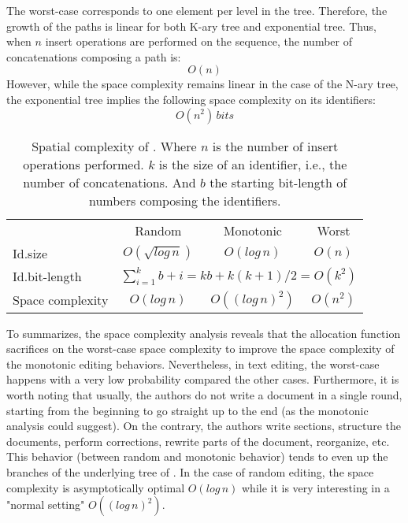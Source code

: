 \begin{asparadesc}
\item [The worst-case] corresponds to one element per level in the
  tree. Therefore, the growth of the paths is linear for both K-ary tree and
  exponential tree. Thus, when $n$ insert operations are performed on the
  sequence, the number of concatenations composing a path is:
  \begin{equation} O(n) \end{equation} However, while the space complexity
  remains linear in the case of the N-ary tree, the exponential tree implies
  the following space complexity on its identifiers:
  \begin{equation} O(n^2) \, bits \end{equation}
\end{asparadesc}

\begin{table}
  \centering
  \begin{tabular}{@{}lccc@{}}
    \toprule
    & Random & Monotonic & Worst \\ \cmidrule{2-4}
    Id.size & $O(\sqrt{log\,n})$ & $O(log\,n)$ & $O(n)$ \\ \midrule
    Id.bit-length & \multicolumn{3}{c}{ $\sum\limits_{i=1}^{k}b+i =
      kb + k(k+1)/2 = O(k^2)$} \\ \midrule
    Space complexity & $O(log\,n)$ & $O((log\,n)^2)$ &
    $O(n^2)$ \\ \bottomrule
  \end{tabular}
  \caption{Spatial complexity of \LSEQ. Where $n$ is the number
    of insert operations performed. $k$ is the size of an identifier, i.e.,
    the number of concatenations. And $b$ the starting bit-length of numbers
    composing the identifiers.}
\end{table}

To summarizes, the space complexity analysis reveals that the allocation
function \LSEQ sacrifices on the worst-case space complexity to improve the
space complexity of the monotonic editing behaviors. Nevertheless, in text
editing, the worst-case happens with a very low probability compared the other
cases. Furthermore, it is worth noting that usually, the authors do not write a
document in a single round, starting from the beginning to go straight up to
the end (as the monotonic analysis could suggest). On the contrary, the authors
write sections, structure the documents, perform corrections, rewrite parts of
the document, reorganize, etc. This behavior (between random and monotonic
behavior) tends to even up the branches of the underlying tree of \LSEQ. In
the case of random editing, the space complexity is asymptotically optimal
$O(log\,n)$ while it is very interesting in a "normal setting" $O((log\,n)^2)$.


